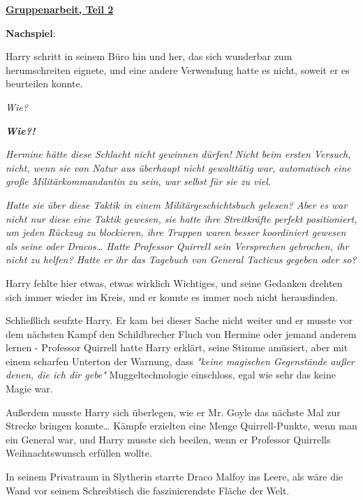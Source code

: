 

\hypertarget{gruppenarbeit-teil-2}{%

\textbf{\uline{Gruppenarbeit, Teil 2}}

\textbf{Nachspiel}:

Harry schritt in seinem Büro hin und her, das sich wunderbar zum herumschreiten eignete, und eine andere Verwendung hatte es nicht, soweit er es beurteilen konnte.

\emph{Wie?}

\textbf{\emph{Wie?!}}

\emph{Hermine hätte diese Schlacht nicht gewinnen dürfen! Nicht beim ersten Versuch, nicht, wenn sie von Natur aus überhaupt nicht gewalttätig war, automatisch eine große Militärkommandantin zu sein, war selbst für sie zu viel.}

\emph{\hfill\break Hatte sie über diese Taktik in einem Militärgeschichtsbuch gelesen? Aber es war nicht nur diese eine Taktik gewesen, sie hatte ihre Streitkräfte perfekt positioniert, um jeden Rückzug zu blockieren, ihre Truppen waren besser koordiniert gewesen als seine oder Dracos… Hatte Professor Quirrell sein Versprechen gebrochen, ihr nicht zu helfen? Hatte er ihr das Tagebuch von General Tacticus gegeben oder so?}

Harry fehlte hier etwas, etwas wirklich Wichtiges, und seine Gedanken drehten sich immer wieder im Kreis, und er konnte es immer noch nicht herausfinden.

Schließlich seufzte Harry. Er kam bei dieser Sache nicht weiter und er musste vor dem nächsten Kampf den Schildbrecher Fluch von Hermine oder jemand anderem lernen - Professor Quirrell hatte Harry erklärt, seine Stimme amüsiert, aber mit einem scharfen Unterton der Warnung, dass \emph{"keine magischen Gegenstände außer denen, die ich dir gebe"} Muggeltechnologie einschloss, egal wie sehr das keine Magie war.

Außerdem musste Harry sich überlegen, wie er Mr. Goyle das nächste Mal zur Strecke bringen konnte… Kämpfe erzielten eine Menge Quirrell-Punkte, wenn man ein General war, und Harry musste sich beeilen, wenn er Professor Quirrells Weihnachtswunsch erfüllen wollte.

In seinem Privatraum in Slytherin starrte Draco Malfoy ins Leere, als wäre die Wand vor seinem Schreibtisch die faszinierendste Fläche der Welt.

}
